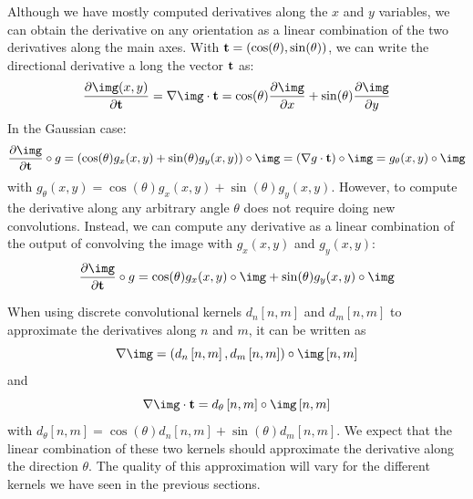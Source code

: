 Although we have mostly computed derivatives along the $x$ and $y$ variables, we can obtain the derivative on any orientation as a linear combination of the two derivatives along the main axes. With ${\bf t}=\left( \cos (\theta), \sin(\theta) \right)$, we can write the directional derivative a long the vector ${\bf t}$ as:
\begin{equation}
	\frac{\partial \img (x,y)}{\partial {\bf t}} =  \nabla \img \cdot {\bf t} = \cos(\theta) \frac{\partial \img}{\partial x} + \sin(\theta) \frac{\partial \img}{\partial y}
\end{equation}
In the Gaussian case:
\begin{equation}
	\frac{\partial \img}{\partial {\bf t}} \circ g = \left( \cos(\theta) g_x(x,y) + \sin(\theta) g_y(x,y) \right) \circ \img = \left( \nabla g  \cdot {\bf t} \right) \circ \img
	= g_{\theta} (x,y)  \circ \img
	\label{eq:steerable_derivative_filter}
\end{equation}
with $g_{\theta} (x,y) = \cos(\theta) g_x(x,y) + \sin(\theta) g_y(x,y)$. However, to compute the derivative along any arbitrary angle $\theta$ does not require doing new convolutions. Instead, we can compute any derivative as a linear combination of the output of convolving the image with $g_x(x,y)$ and $g_y(x,y)$:
\begin{equation}
	\frac{\partial \img}{\partial {\bf t}} \circ g =  \cos(\theta) g_x(x,y) \circ \img + \sin(\theta) g_y(x,y) \circ \img
\end{equation}

When using discrete convolutional kernels $d_n\left[n,m\right]$ and $d_m\left[n,m\right]$ to approximate the derivatives along $n$ and $m$, it can be written as
\begin{equation}
	\nabla \img = \left( d_n\left[n,m\right], d_m\left[n,m\right] \right) \circ \img \left[n,m\right]
\end{equation}
and
\begin{equation}
	\nabla \img \cdot {\bf t} =d_{\theta} \left[n,m\right] \circ \img \left[n,m\right]
\end{equation}
with $d_{\theta} \left[n,m\right]  = \cos(\theta) d_n\left[n,m\right] + \sin(\theta) d_m\left[n,m\right]$. We expect that the linear combination of these two kernels should approximate the derivative along the direction $\theta$. The quality of this approximation will vary for the different kernels we have seen in the previous sections.





